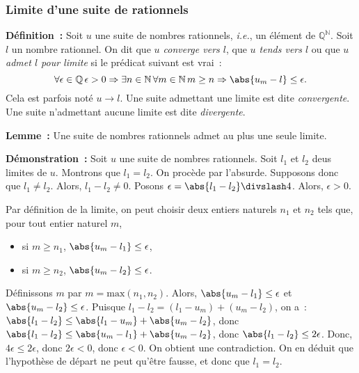 \done

\subsubsection{Limite d'une suite de rationnels}

\noindent\textbf{Définition :} Soit $u$ une suite de nombres rationnels, \emph{i.e.}, un élément de $\mathbb{Q}^{\mathbb{N}}$.
    Soit $l$ un nombre rationnel.
    On dit que \emph{$u$ converge vers $l$}, que \emph{$u$ tends vers $l$} ou que \emph{$u$ admet $l$ pour limite} si le prédicat suivant est vrai : 
    \begin{equation*}
        \forall \epsilon \in \mathbb{Q} \, 
        \epsilon > 0 \Rightarrow
            \exists n \in \mathbb{N} \, 
            \forall m \in \mathbb{N} \, 
            m \geq n \Rightarrow
                \abs{u_m - l} \leq \epsilon .
    \end{equation*}
    Cela est parfois noté $u \rightarrow l$.
    Une suite admettant une limite est dite \emph{convergente}. 
    Une suite n'admettant aucune limite est dite \emph{divergente}. 

\medskip

\noindent\textbf{Lemme :} Une suite de nombres rationnels admet au plus une seule limite.

\medskip

\noindent\textbf{Démonstration :} Soit $u$ une suite de nombres rationnels. 
    Soit $l_1$ et $l_2$ deus limites de $u$. 
    Montrons que $l_1 = l_2$. 
    On procède par l'absurde. 
    Supposons donc que $l_1 \neq l_2$.
    Alors, $l_1 - l_2 \neq 0$. 
    Posons $\epsilon = \abs{l_1 - l_2} \divslash 4$. 
    Alors, $\epsilon > 0$.
    
    Par définition de la limite, on peut choisir deux entiers naturels $n_1$ et $n_2$ tels que, pour tout entier naturel $m$,
    \begin{itemize}[nosep]
        \item si $m \geq n_1$, $\abs{u_m - l_1} \leq \epsilon$,
        \item si $m \geq n_2$, $\abs{u_m - l_2} \leq \epsilon$.
    \end{itemize}
    Définissons $m$ par $m = \mathrm{max}(n_1, n_2)$.
    Alors, $\abs{u_m - l_1} \leq \epsilon$ et $\abs{u_m - l_2} \leq \epsilon$.
    Puisque $l_1 - l_2 = (l_1 - u_m) + (u_m - l_2)$, on a : $\abs{l_1 - l_2} \leq \abs{l_1 - u_m} + \abs{u_m - l_2}$, donc $\abs{l_1 - l_2} \leq \abs{u_m - l_1} + \abs{u_m - l_2}$, donc $\abs{l_1 - l_2} \leq 2 \epsilon$.
    Donc, $4 \epsilon \leq 2 \epsilon$, donc $2 \epsilon < 0$, donc $\epsilon < 0$.
    On obtient une contradiction. 
    On en déduit que l'hypothèse de départ ne peut qu'être fausse, et donc que $l_1 = l_2$.

